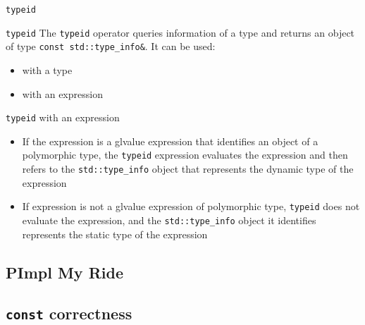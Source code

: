 \begin{frame}{\texttt{typeid}}{}
  \begin{block}{\texttt{typeid}}
    The \lstinline!typeid! operator queries information of a type and returns an object of type \lstinline!const std::type_info&!. It can be used:
    \begin{itemize}
    \item
      with a type
    \item
      with an expression
    \end{itemize}
  \end{block}

  \begin{block}{\texttt{typeid} with an expression}
    \begin{itemize}
    \item
      If the expression is a glvalue expression that identifies an object of a polymorphic type, the \lstinline!typeid! expression evaluates the expression and then refers to the \lstinline!std::type_info! object that represents the dynamic type of the expression
    \item
      If expression is not a glvalue expression of polymorphic type, \lstinline!typeid! does not evaluate the expression, and the \lstinline!std::type_info! object it identifies represents the static type of the expression
    \end{itemize}
  \end{block}
\end{frame}


\subsection{PImpl My Ride}


\subsection{\texttt{const} correctness}

%
%
%



